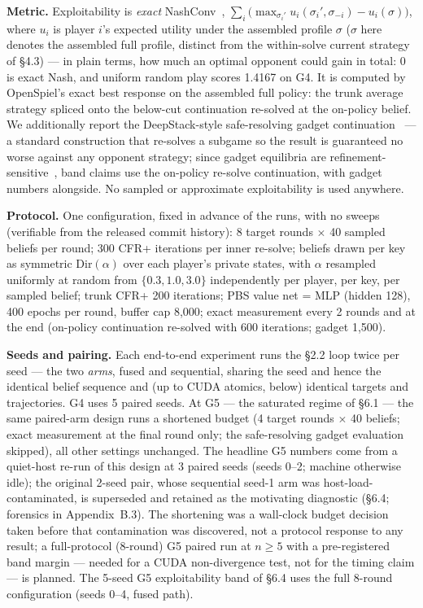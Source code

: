 \documentclass[11pt]{article}
\begin{document}
\textbf{Metric.} Exploitability is \emph{exact} NashConv~\citep{Lanctot2017}, $\sum_i
\big(\max_{\sigma_i'} u_i(\sigma_i', \sigma_{-i}) - u_i(\sigma)\big)$, where $u_i$ is
player $i$'s expected utility under the assembled profile $\sigma$ ($\sigma$ here
denotes the assembled full profile, distinct from the within-solve current strategy of
\S4.3) --- in plain terms, how much an optimal opponent could gain in total: 0 is exact
Nash, and uniform random play scores 1.4167 on G4. It is computed by OpenSpiel's exact
best response on the assembled full policy: the trunk average strategy spliced onto the
below-cut continuation re-solved at the on-policy belief. We additionally report the
DeepStack-style safe-resolving gadget continuation~\citep{Burch2014,Moravcik2017} --- a
standard construction that re-solves a subgame so the result is guaranteed no worse
against any opponent strategy; since gadget equilibria are
refinement-sensitive~\citep{Kubicek2026}, band claims use the on-policy re-solve
continuation, with gadget numbers alongside. No sampled or approximate exploitability is
used anywhere.

\textbf{Protocol.} One configuration, fixed in advance of the runs, with no sweeps
(verifiable from the released commit history): 8 target rounds $\times$ 40 sampled
beliefs per round; 300 CFR+ iterations per inner re-solve; beliefs drawn per key as
symmetric $\mathrm{Dir}(\alpha)$ over each player's private states, with $\alpha$
resampled uniformly at random from $\{0.3, 1.0, 3.0\}$ independently per player, per
key, per sampled belief; trunk CFR+ 200 iterations; PBS value net = MLP (hidden 128),
400 epochs per round, buffer cap 8,000; exact measurement every 2 rounds and at the end
(on-policy continuation re-solved with 600 iterations; gadget 1,500).

\textbf{Seeds and pairing.} Each end-to-end experiment runs the \S2.2 loop twice per
seed --- the two \emph{arms}, fused and sequential, sharing the seed and hence the
identical belief sequence and (up to CUDA atomics, below) identical targets and
trajectories. G4 uses 5 paired seeds. At G5 --- the saturated regime of \S6.1 --- the
same paired-arm design runs a shortened budget (4 target rounds $\times$ 40 beliefs;
exact measurement at the final round only; the safe-resolving gadget evaluation
skipped), all other settings unchanged. The headline G5 numbers come from a quiet-host
re-run of this design at 3 paired seeds (seeds 0--2; machine otherwise idle); the
original 2-seed pair, whose sequential seed-1 arm was host-load-contaminated, is
superseded and retained as the motivating diagnostic (\S6.4; forensics in
Appendix~B.3). The shortening was a wall-clock budget decision taken before that
contamination was discovered, not a protocol response to any result; a full-protocol
(8-round) G5 paired run at $n \ge 5$ with a pre-registered band margin --- needed for a
CUDA non-divergence test, not for the timing claim --- is planned. The 5-seed G5
exploitability band of \S6.4 uses the full 8-round configuration (seeds 0--4, fused
path).
\end{document}
